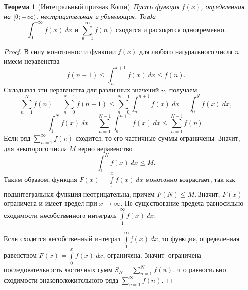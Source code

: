 \documentclass[12pt]{report}
\newtheorem{theorem}{Теорема}
\begin{document}
\begin{theorem}[Интегральный признак Коши]
Пусть функция $f(x)$, определенная на $[0; +\infty)$, неотрицательная и убывающая. Тогда
\[ \int_0^{+\infty} f(x)~dx \text{ и } \sum_{n = 1}^{\infty} f(n) \text{ сходятся и расходятся одновременно}.\]
\end{theorem}

\begin{proof}
В силу монотонности функции $f(x)$ для любого натурального числа $n$ имеем неравенства
\[ f(n+1) \leqslant \int_n^{n+1} f(x)~dx \leqslant f(n).\]
Складывая эти неравенства для различных значений $n$, получаем
\[ \sum_{n = 1}^{N} f(n) = \sum_{n=0}^{N-1} f(n + 1) \leqslant \sum_{n = 0}^{N-1} \int_n^{n+1} f(x)~dx = \int_0^{N} f(x)~dx,\]
\[ \int_1^{N} f(x)~dx = \sum_{n = 1}^{N - 1} \int_n^{n+1} f(x)~dx \leqslant \sum_{n=1}^{N-1} f(n).\]
Если ряд $\sum\limits_{n=1}^{\infty} f(n)$ сходится, то его частичные суммы ограничены. Значит, для некоторого числа $M$ верно неравенство
\[ \int_1^N f(x)~dx \leqslant M.\]
Таким образом, функция $F(x) = \int\limits_{1}^{x} f(x)~dx$ монотонно возрастает, так как подынтегральная функция неотрицательна, причем $F(N) \leqslant M$. Значит, $F(x)$ ограничена и имеет предел при $x \to \infty$. Но существование предела равносильно сходимости несобственного интеграла $\int\limits_1^{\infty} f(x)~dx$.

Если сходится несобственный интеграл $\int\limits_1^{\infty} f(x)~dx$, то функция, определенная равенством $F(x) = \int\limits_{0}^x f(x)~dx$, ограничена. Значит, ограничена последовательность частичных сумм $S_N = \sum\limits_{n = 1}^{N} f(n)$, что равносильно сходимости знакоположительного ряда $\sum\limits_{n = 1}^{\infty} f(n)$.
\end{proof}
\end{document}
